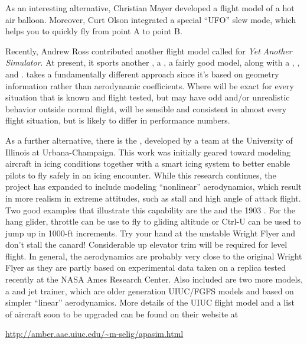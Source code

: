As an interesting alternative, Christian Mayer developed a flight model of a hot air
balloon. Moreover, Curt Olson integrated a special ``UFO'' slew mode, which
helps you to quickly fly from point A to point B.

Recently, Andrew Ross contributed another flight model called \YASim{} for
\textit{Yet Another Simulator}. At present, it sports another , a
, a fairly good  model, along with a ,
, and . \YASim{} takes a fundamentally different approach since it's
based on geometry information rather than aerodynamic coefficients. Where \JSBSim{} will be exact for every situation that is known and flight tested, but may have odd and/or unrealistic behavior outside normal flight, \YASim{} will be sensible and consistent in almost every flight situation, but is likely to differ in performance numbers.

As a further alternative, there is the , developed by a 
team at the University of Illinois at Urbana-Champaign.  This work was 
initially geared toward modeling aircraft in icing conditions together with a smart icing system to better enable pilots to fly safely in an icing 
encounter.  While this research continues, the project has expanded to 
include modeling ``nonlinear'' aerodynamics, which result in more realism 
in extreme attitudes, such as stall and high angle of attack flight.  Two 
good examples that illustrate this capability are the  
 and the 1903 .  For the hang glider, throttle can 
be use to fly to gliding altitude or Ctrl-U can be used to jump up in 
1000-ft increments.  Try your hand at the unstable Wright Flyer and don't 
stall the canard!  Considerable up elevator trim will be required for level 
flight.  In general, the aerodynamics are probably very close to the 
original Wright Flyer as they are partly based on experimental data taken 
on a replica tested recently at the NASA Ames Research Center.  Also 
included are two more models, a  and  jet trainer, 
which are older generation UIUC/FGFS models and based on simpler ``linear'' 
aerodynamics.  More details of the UIUC flight model and a list of aircraft 
soon to be upgraded can be found on their website at
\medskip

\href{http://amber.aae.uiuc.edu/~m-selig/apasim.html}{http://amber.aae.uiuc.edu/\~{}m-selig/apasim.html}
\medskip

